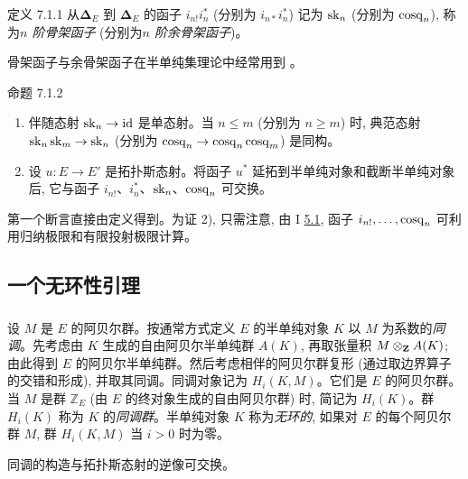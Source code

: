 \begin{enonce*}{定义 7.1.1}
从\pageoriginale $𝚫_E$ 到 $𝚫_E$ 的函子 $i_{n!}i_n^\ast$ (分别为 $i_{n\ast}i_n^\ast$) 记为 $\operatorname{sk}_n$ (分别为 $\operatorname{cosq}_n$), 称为\emph{$n$ 阶骨架函子} (分别为\emph{$n$ 阶余骨架函子})。
\end{enonce*}

骨架函子与余骨架函子在半单纯集理论中经常用到 \cite{sga4.exp.V.bib.3}。

\begin{enonce*}{命题 7.1.2}
\begin{enumerate}
\renewcommand{\labelenumi}{\theenumi)}
\item 伴随态射 $\sk_n\to\id$ 是单态射。当 $n\leq m$ (分别为 $n\geq m$) 时, 典范态射 $\sk_n\sk_m\to\sk_n$ (分别为 $\cosk_n\to\cosk_n\cosk_m$) 是同构。

\item 设 $u:E\to E'$ 是拓扑斯态射。将函子 $u^\ast$ 延拓到半单纯对象和截断半单纯对象后, 它与函子 $i_{n!}$、$i_n^\ast$、$\operatorname{sk}_n$、$\operatorname{cosq}_n$ 可交换。
\end{enumerate}
\end{enonce*}

第一个断言直接由定义得到。为证 2), 只需注意, 由 I \hyperref[I.prop5.1]{5.1}, 函子 $i_{n!},\dots,\operatorname{cosq}_n$ 可利用归纳极限和有限投射极限计算。

\subsection{一个无环性引理}

\setcounter{subsubsection}{-1}
\subsubsection{}

设 $M$ 是 $E$ 的阿贝尔群。按通常方式定义 $E$ 的半单纯对象 $K$ 以 $M$ 为系数的\emph{同调}。先考虑由 $K$ 生成的自由阿贝尔半单纯群 $A(K)$, 再取张量积 $M\otimes_{\mathbf{Z}}A(K)$; 由此得到 $E$ 的阿贝尔半单纯群。然后考虑相伴的阿贝尔群复形 (通过取边界算子的交错和形成), 并取其同调。同调对象记为 $H_i(K,M)$。它们是 $E$ 的阿贝尔群。当 $M$ 是群 $\mathbb{Z}_E$ (由 $E$ 的终对象生成的自由阿贝尔群) 时, 简记为 $H_i(K)$。群 $H_i(K)$ 称为 $K$ 的\emph{同调群}。半单纯对象 $K$ 称为\emph{无环的}, 如果对 $E$ 的每个阿贝尔群 $M$, 群 $H_i(K,M)$ 当 $i>0$ 时为零。

同调的构造与拓扑斯态射的逆像可交换\pageoriginale。

